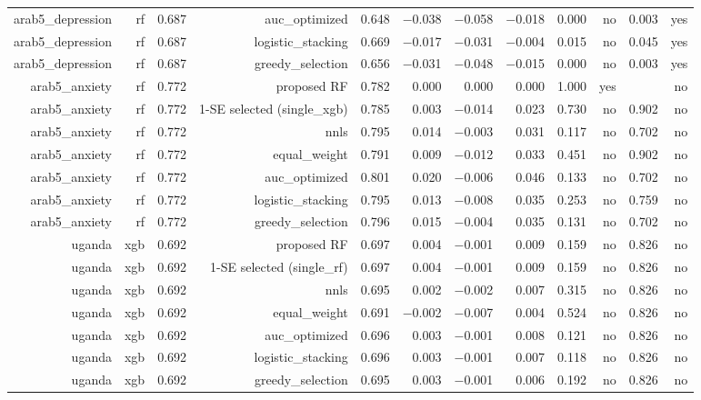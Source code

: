 \documentclass[10pt]{article}
\begin{document}
\begin{longtable}{rrrrrrrrrrrr}
arab5\_depression & rf & 0.687 & auc\_optimized & 0.648 & $-$0.038 & $-$0.058 & $-$0.018 & 0.000 & no & 0.003 & yes \\
arab5\_depression & rf & 0.687 & logistic\_stacking & 0.669 & $-$0.017 & $-$0.031 & $-$0.004 & 0.015 & no & 0.045 & yes \\
arab5\_depression & rf & 0.687 & greedy\_selection & 0.656 & $-$0.031 & $-$0.048 & $-$0.015 & 0.000 & no & 0.003 & yes \\
arab5\_anxiety & rf & 0.772 & proposed RF & 0.782 & 0.000 & 0.000 & 0.000 & 1.000 & yes &  & no \\
arab5\_anxiety & rf & 0.772 & 1-SE selected (single\_xgb) & 0.785 & 0.003 & $-$0.014 & 0.023 & 0.730 & no & 0.902 & no \\
arab5\_anxiety & rf & 0.772 & nnls & 0.795 & 0.014 & $-$0.003 & 0.031 & 0.117 & no & 0.702 & no \\
arab5\_anxiety & rf & 0.772 & equal\_weight & 0.791 & 0.009 & $-$0.012 & 0.033 & 0.451 & no & 0.902 & no \\
arab5\_anxiety & rf & 0.772 & auc\_optimized & 0.801 & 0.020 & $-$0.006 & 0.046 & 0.133 & no & 0.702 & no \\
arab5\_anxiety & rf & 0.772 & logistic\_stacking & 0.795 & 0.013 & $-$0.008 & 0.035 & 0.253 & no & 0.759 & no \\
arab5\_anxiety & rf & 0.772 & greedy\_selection & 0.796 & 0.015 & $-$0.004 & 0.035 & 0.131 & no & 0.702 & no \\
uganda & xgb & 0.692 & proposed RF & 0.697 & 0.004 & $-$0.001 & 0.009 & 0.159 & no & 0.826 & no \\
uganda & xgb & 0.692 & 1-SE selected (single\_rf) & 0.697 & 0.004 & $-$0.001 & 0.009 & 0.159 & no & 0.826 & no \\
uganda & xgb & 0.692 & nnls & 0.695 & 0.002 & $-$0.002 & 0.007 & 0.315 & no & 0.826 & no \\
uganda & xgb & 0.692 & equal\_weight & 0.691 & $-$0.002 & $-$0.007 & 0.004 & 0.524 & no & 0.826 & no \\
uganda & xgb & 0.692 & auc\_optimized & 0.696 & 0.003 & $-$0.001 & 0.008 & 0.121 & no & 0.826 & no \\
uganda & xgb & 0.692 & logistic\_stacking & 0.696 & 0.003 & $-$0.001 & 0.007 & 0.118 & no & 0.826 & no \\
uganda & xgb & 0.692 & greedy\_selection & 0.695 & 0.003 & $-$0.001 & 0.006 & 0.192 & no & 0.826 & no \\
\bottomrule
\end{longtable}
\normalsize
\end{document}

